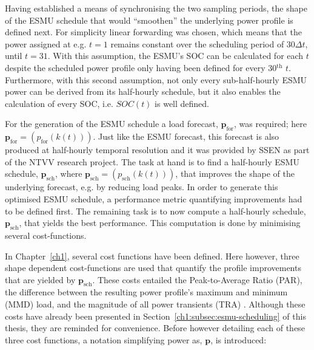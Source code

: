

Having established a means of synchronising the two sampling periods, the shape of the ESMU schedule that would ``smoothen'' the underlying power profile is defined next.
For simplicity linear forwarding was chosen, which means that the power assigned at e.g. $t=1$ remains constant over the scheduling period of $30\Delta t$, until $t=31$.
With this assumption, the ESMU's SOC can be calculated for each $t$ despite the scheduled power profile only having been defined for every 30$^\text{th}$ $t$.
Furthermore, with this second assumption, not only every sub-half-hourly ESMU power can be derived from its half-hourly schedule, but it also enables the calculation of every SOC, i.e. $SOC(t)$ is well defined.


For the generation of the ESMU schedule a load forecast, $\textbf{p}_\text{for}$, was required; here $\textbf{p}_\text{for} = (p_\text{for}(k(t)))$.
Just like the ESMU forecast, this forecast is also produced at half-hourly temporal resolution and it was provided by SSEN as part of the NTVV research project.
The task at hand is to find a half-hourly ESMU schedule, $\textbf{p}_\text{sch}$, where $\textbf{p}_\text{sch} = (p_\text{sch}(k(t)))$, that improves the shape of the underlying forecast, e.g. by reducing load peaks.
In order to generate this optimised ESMU schedule, a performance metric quantifying improvements had to be defined first.
The remaining task is to now compute a half-hourly schedule, $\textbf{p}_\text{sch}$, that yields the best performance.
This computation is done by minimising several cost-functions.

In Chapter~\ref{ch1}, several cost functions have been defined.
Here however, three shape dependent cost-functions are used that quantify the profile improvements that are yielded by $\textbf{p}_\text{sch}$.
These costs entailed the Peak-to-Average Ratio (PAR), the difference between the resulting power profile's maximum and minimum (MMD) load, and the magnitude of all power transients (TRA) \cite{Mohsenian-Rad2010, Mostafa2016}.
Although these costs have already been presented in Section~\ref{ch1:subsec:esmu-scheduling} of this thesis, they are reminded for convenience.
Before however detailing each of these three cost functions, a notation simplifying power as, $\textbf{p}$, is introduced:

